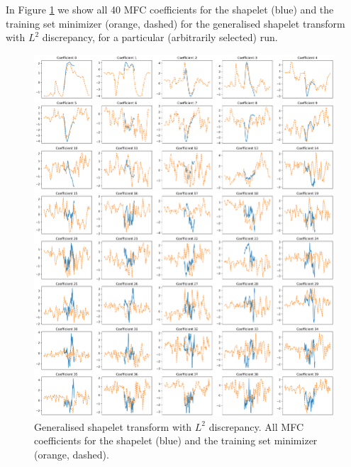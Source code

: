 \documentclass{article}
\theoremstyle{plain}
\theoremstyle{definition}
\begin{document}
	In Figure \ref{fig:speech_commands_axisplot} we show all 40 MFC coefficients for the shapelet (blue) and the training set minimizer (orange, dashed) for the generalised shapelet transform with $L^2$ discrepancy, for a particular (arbitrarily selected) run.
	\begin{figure}[t]
			\centering
			\includegraphics[width=\linewidth]{images/new_speech_commands_axisplots.png}
		\caption{Generalised shapelet transform with $L^2$ discrepancy. All MFC coefficients for the shapelet (blue) and the training set minimizer (orange, dashed).}
		\label{fig:speech_commands_axisplot}
	\end{figure}
\end{document}
